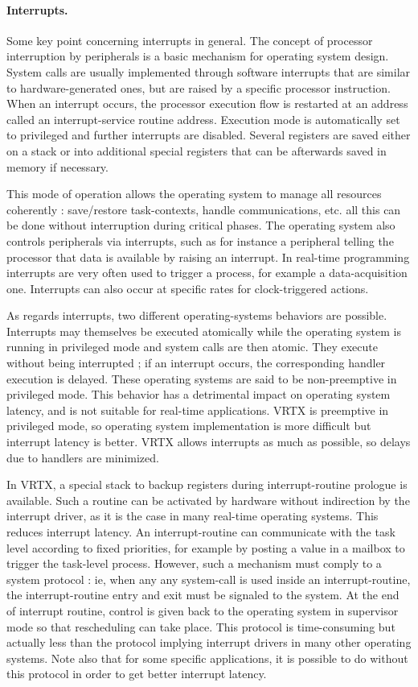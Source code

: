 \documentclass[10pt]{report}
\begin{document}
\paragraph{Interrupts.} Some key point concerning interrupts in general. The concept of
processor interruption by peripherals is a basic mechanism for
operating system design. System calls are usually implemented
through software interrupts that are similar to
hardware-generated ones, but are raised by a specific processor
instruction. When an interrupt occurs, the processor execution
flow is restarted at an address called an interrupt-service
routine address. Execution mode is automatically set to
privileged and further interrupts are disabled. Several registers
are saved either on a stack or into additional special registers
that can be afterwards saved in memory if necessary.

This mode of operation allows the operating system to manage all
resources coherently : save/restore task-contexts, handle
communications, etc. all this can be done without interruption
during critical phases. The operating system also controls
peripherals via interrupts, such as for instance a peripheral
telling the processor that data is available by raising an
interrupt. In real-time programming interrupts are very often
used to trigger a process, for example a data-acquisition one.
Interrupts can also occur at specific rates for clock-triggered
actions.

As regards interrupts, two different operating-systems behaviors
are possible. Interrupts may themselves be executed atomically while
the operating system is running in privileged mode and system
calls are then atomic. They execute without being interrupted ;
if an interrupt occurs, the corresponding handler execution is
delayed. These operating systems are said to be non-preemptive in
privileged mode. This behavior has a detrimental impact on
operating system latency, and is not suitable for real-time
applications. VRTX is preemptive in privileged mode, so operating
system implementation is more difficult but interrupt latency is
better. VRTX allows interrupts as much as possible, so delays due
to handlers are minimized.

In VRTX, a special stack to backup registers during
interrupt-routine prologue is available. Such a routine can be
activated by hardware without indirection by the interrupt
driver, as it is the case in many real-time operating systems.
This reduces interrupt latency. An interrupt-routine can
communicate with the task level according to fixed priorities,
for example by posting a value in a mailbox to trigger the
task-level process. However, such a mechanism must comply to a
system protocol : ie, when any any system-call is used inside an
interrupt-routine, the interrupt-routine entry and exit must be
signaled to the system. At the end of interrupt routine, control
is given back to the operating system in supervisor mode so that
rescheduling can take place. This protocol is time-consuming but
actually less than the protocol implying interrupt drivers in
many other operating systems. Note also that for some specific
applications, it is possible to do without this protocol in order
to get better interrupt latency.
\end{document}
